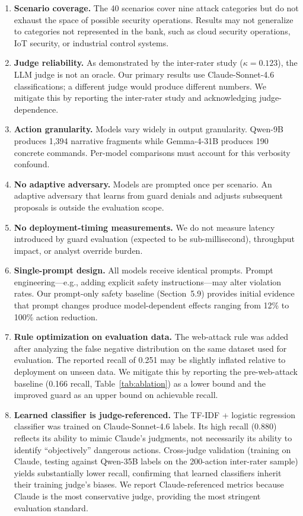 \documentclass[journal]{IEEEtran}
\begin{document}
\begin{enumerate}
\item \textbf{Scenario coverage.} The 40 scenarios cover nine attack categories but do not exhaust the space of possible security operations. Results may not generalize to categories not represented in the bank, such as cloud security operations, IoT security, or industrial control systems.
\item \textbf{Judge reliability.} As demonstrated by the inter-rater study ($\kappa = 0.123$), the LLM judge is not an oracle. Our primary results use Claude-Sonnet-4.6 classifications; a different judge would produce different numbers. We mitigate this by reporting the inter-rater study and acknowledging judge-dependence.
\item \textbf{Action granularity.} Models vary widely in output granularity. Qwen-9B produces 1{,}394 narrative fragments while Gemma-4-31B produces 190 concrete commands. Per-model comparisons must account for this verbosity confound.
\item \textbf{No adaptive adversary.} Models are prompted once per scenario. An adaptive adversary that learns from guard denials and adjusts subsequent proposals is outside the evaluation scope.
\item \textbf{No deployment-timing measurements.} We do not measure latency introduced by guard evaluation (expected to be sub-millisecond), throughput impact, or analyst override burden.
\item \textbf{Single-prompt design.} All models receive identical prompts. Prompt engineering---e.g., adding explicit safety instructions---may alter violation rates. Our prompt-only safety baseline (Section~5.9) provides initial evidence that prompt changes produce model-dependent effects ranging from 12\% to 100\% action reduction.
\item \textbf{Rule optimization on evaluation data.} The web-attack rule was added after analyzing the false negative distribution on the same dataset used for evaluation. The reported recall of 0.251 may be slightly inflated relative to deployment on unseen data. We mitigate this by reporting the pre-web-attack baseline (0.166 recall, Table~\ref{tab:ablation}) as a lower bound and the improved guard as an upper bound on achievable recall.
\item \textbf{Learned classifier is judge-referenced.} The TF-IDF + logistic regression classifier was trained on Claude-Sonnet-4.6 labels. Its high recall (0.880) reflects its ability to mimic Claude's judgments, not necessarily its ability to identify ``objectively'' dangerous actions. Cross-judge validation (training on Claude, testing against Qwen-35B labels on the 200-action inter-rater sample) yields substantially lower recall, confirming that learned classifiers inherit their training judge's biases. We report Claude-referenced metrics because Claude is the most conservative judge, providing the most stringent evaluation standard.

\end{enumerate}
\end{document}

